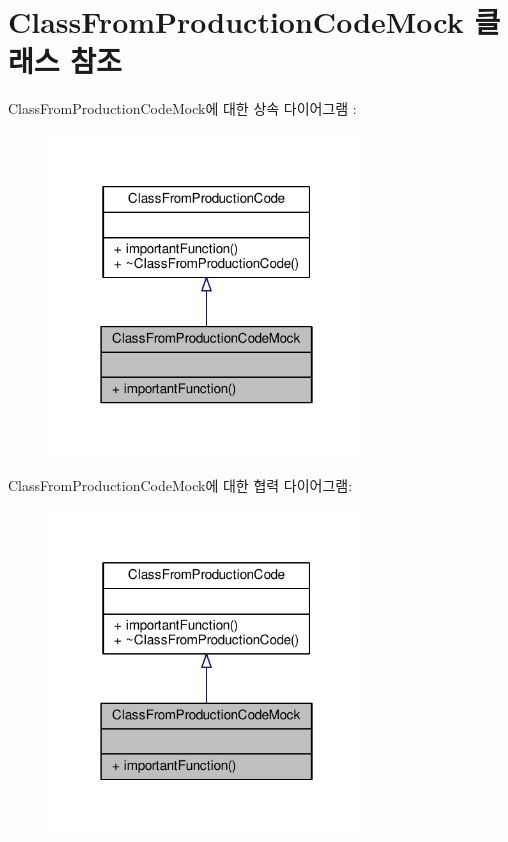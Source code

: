 \hypertarget{class_class_from_production_code_mock}{}\section{Class\+From\+Production\+Code\+Mock 클래스 참조}
\label{class_class_from_production_code_mock}


Class\+From\+Production\+Code\+Mock에 대한 상속 다이어그램 \+: 
\nopagebreak
\begin{figure}[H]
\begin{center}
\leavevmode
\includegraphics[width=238pt]{class_class_from_production_code_mock__inherit__graph}
\end{center}
\end{figure}


Class\+From\+Production\+Code\+Mock에 대한 협력 다이어그램\+:
\nopagebreak
\begin{figure}[H]
\begin{center}
\leavevmode
\includegraphics[width=238pt]{class_class_from_production_code_mock__coll__graph}
\end{center}
\end{figure}

